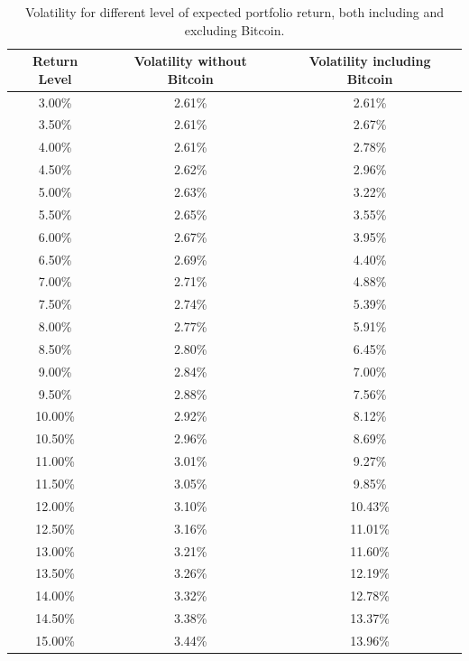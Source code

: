 \begin{table}
	\small
	\centering
	\caption[Markowitz efficient frontier on returns]{Volatility for different level of expected portfolio return, both including and excluding Bitcoin.}
	\label{tab:markowitz_vol_on_ret}
\begin{tabular}{ccc}
	Return Level & Volatility without Bitcoin & Volatility including Bitcoin\\
	\midrule
	3.00\% & 2.61\% & 2.61\% \\
	3.50\% & 2.61\% & 2.67\% \\
	4.00\% & 2.61\% & 2.78\% \\
	4.50\% & 2.62\% & 2.96\% \\
	5.00\% & 2.63\% & 3.22\% \\
	5.50\% & 2.65\% & 3.55\% \\
	6.00\% & 2.67\% & 3.95\% \\
	6.50\% & 2.69\% & 4.40\% \\
	7.00\% & 2.71\% & 4.88\% \\
	7.50\% & 2.74\% & 5.39\% \\
	8.00\% & 2.77\% & 5.91\% \\
	8.50\% & 2.80\% & 6.45\% \\
	9.00\% & 2.84\% & 7.00\% \\
	9.50\% & 2.88\% & 7.56\% \\
	10.00\% & 2.92\% & 8.12\% \\
	10.50\% & 2.96\% & 8.69\% \\
	11.00\% & 3.01\% & 9.27\% \\
	11.50\% & 3.05\% & 9.85\% \\
	12.00\% & 3.10\% & 10.43\% \\
	12.50\% & 3.16\% & 11.01\% \\
	13.00\% & 3.21\% & 11.60\% \\
	13.50\% & 3.26\% & 12.19\% \\
	14.00\% & 3.32\% & 12.78\% \\
	14.50\% & 3.38\% & 13.37\% \\
	15.00\% & 3.44\% & 13.96\% \\
	\midrule
\end{tabular}

\end{table}


